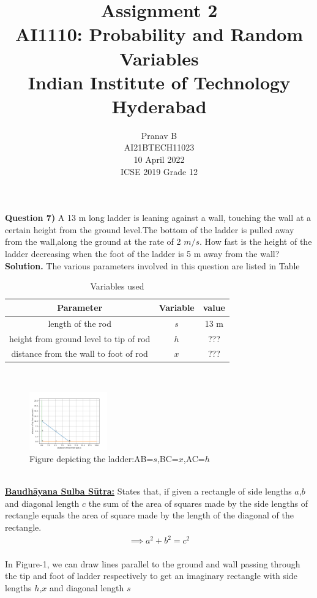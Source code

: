 \documentclass[journal,12pt,twocolumn]{IEEEtran}
\title{Assignment 2 \\ \Large AI1110: Probability and Random Variables \\ \large Indian Institute of Technology Hyderabad}
\author{Pranav B \\ \normalsize AI21BTECH11023 \\ \vspace*{20pt} \normalsize  10 April 2022 \\ \vspace*{20pt} \Large ICSE 2019 Grade 12}
\begin{document}
	\maketitle
	
	\textbf{Question 7)} 
	A 13 m long ladder is leaning against a wall, touching the wall at a certain height from the ground level.The bottom of the ladder is pulled away from the wall,along the ground at the rate of 2 $m/s$. How fast is the height of the ladder decreasing when the foot of the ladder is 5 m away from the wall?\\
	\textbf{Solution.}
	The various parameters involved in this question are listed in Table \begin{table}[h]
\caption{Variables used}
\begin{tabular}{|c|c|c|}
\hline
Parameter & Variable & value\\
\hline
length of the rod & $s$ & 13 m\\
\hline
height from ground level to tip of rod & $h$ & ???\\
\hline
distance from the wall to foot of rod & $x$ &???\\
\hline
\end{tabular}
\end{table}
\\
\begin{figure}[h]
\includegraphics[width=0.3\textwidth]{Pic2}
\caption{Figure depicting the ladder:AB=$s$,BC=$x$,AC=$h$}
\label{fig:my_label}
\end{figure}
\\
\underline{\textbf{Baudhāyana Sulba Sūtra:}}
States that, if given a rectangle of side lengths $a$,$b$ and diagonal length $c$ the sum of the area of squares made by the side lengths of rectangle equals the area of square made by the length of the diagonal of the rectangle.\\
\begin{align}
\implies a^2+b^2=c^2
\end{align}
\\
In Figure-1, we can draw lines parallel to the ground and wall passing through the tip and foot of ladder respectively to get an imaginary rectangle with side lengths $h$,$x$ and diagonal length $s$\\
\end{document}
